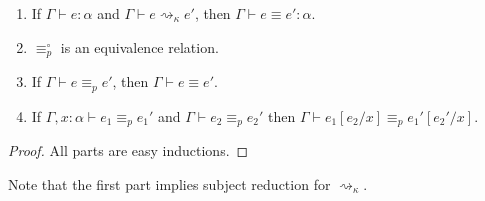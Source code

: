 \begin{lemma}
\begin{enumerate}
\item If $\Gamma\vdash e:\alpha$ and $\Gamma\vdash e\rightsquigarrow_\kappa e'$, then $\Gamma\vdash e\equiv e':\alpha$.
\item $\equiv_p^\circ$ is an equivalence relation.
\item If $\Gamma\vdash e\equiv_p e'$, then $\Gamma\vdash e\equiv e'$.
\item\label{p_subst} If $\Gamma,x:\alpha\vdash e_1\equiv_p e_1'$ and $\Gamma\vdash e_2\equiv_p e_2'$ then $\Gamma\vdash e_1[e_2/x]\equiv_p e_1'[e_2'/x]$.
\end{enumerate}
\end{lemma}
\begin{proof}
All parts are easy inductions.
\end{proof}
Note that the first part implies subject reduction for $\rightsquigarrow_\kappa$.

